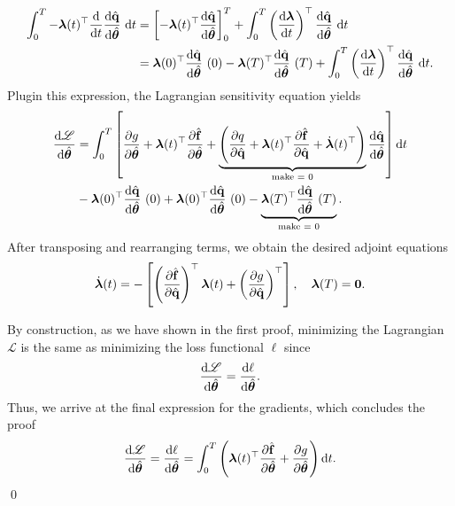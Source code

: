 \begin{align*}
    \int_0^T -\bm{\lambda}(t)^{\top}\dv{t}\dv{\hat{\mathbf{q}}}{\hat{\bm{\theta}}}~\dd t &= \left[ -\bm{\lambda}(t)^{\top}\dv{\hat{\mathbf{q}}}{\hat{\bm{\theta}}}\right]_0^T + \int_0^T \left( \dv{\bm{\lambda}}{t}\right)^{\top}\dv{\hat{\mathbf{q}}}{\hat{\bm{\theta}}}~\dd t\\
    &= \bm{\lambda}(0)^{\top}\dv{\hat{\mathbf{q}}}{\hat{\bm{\theta}}}~(0) - \bm{\lambda}(T)^{\top}\dv{\hat{\mathbf{q}}}{\hat{\bm{\theta}}}~(T) + \int_0^T \left( \dv{\bm{\lambda}}{t}\right)^{\top}\dv{\hat{\mathbf{q}}}{\hat{\bm{\theta}}}~\dd t.
\end{align*}
Plugin this expression, the Lagrangian sensitivity equation  yields\\
\begin{align*}
   \dv{\mathscr{L}}{\hat{\bm{\theta}}} &= \int_0^T\left[ \pdv{g}{\hat{\bm{\theta}}} + \bm{\lambda}(t)^{\top} \pdv{\hat{\mathbf{f}}}{\hat{\bm{\theta}}} + \underbrace{\left( \pdv{q}{\hat{\mathbf{q}}} + \bm{\lambda}(t)^{\top}\pdv{\hat{\mathbf{f}}}{\hat{\mathbf{q}}}+ \dot{\bm{\lambda}}(t)^{\top}\right)}_{\text{make = 0}} \dv{\hat{\mathbf{q}}}{\hat{\bm{\theta}}} \right]\dd t \\
   & - \bm{\lambda}(0)^{\top}\dv{\hat{\mathbf{q}}}{\hat{\bm{\theta}}}~(0)+\bm{\lambda}(0)^{\top}\dv{\hat{\mathbf{q}}}{\hat{\bm{\theta}}}~(0) - \underbrace{\bm{\lambda}(T)^{\top}\dv{\hat{\mathbf{q}}}{\hat{\bm{\theta}}}~(T)}_{\text{make = 0}}.
\end{align*}
 After transposing and rearranging terms, we obtain the desired adjoint equations\\
\begin{equation*}
    \dot{\bm{\lambda}}(t) = -\left[ \left(\pdv{\hat{\mathbf{f}}}{\hat{\mathbf{q}}}\right)^{\top} \bm{\lambda}(t)  + \left(\pdv{g}{\hat{\mathbf{q}}}\right)^{\top}\right], \quad\bm{\lambda}(T) = \bm{0}.
\end{equation*}

By construction, as we have shown in the first proof,  minimizing the Lagrangian $\mathscr{L}$ is the same as minimizing the loss functional $\ell$ since\\
$$\dv{\mathscr{L}}{\hat{\bm{\theta}}} = \dv{\ell}{\hat{\bm{\theta}}}.$$
Thus, we arrive at the final expression for the gradients, which concludes the proof\\
\begin{equation*}
    \dv{\mathscr{L}}{\hat{\bm{\theta}}} =\dv{\ell}{\hat{\bm{\theta}}} = \int_0^T\left(  \bm{\lambda}(t)^{\top} \pdv{\hat{\mathbf{f}}}{\hat{\bm{\theta}}} + \pdv{g}{\hat{\bm{\theta}}} \right)\dd t .
\end{equation*}
\qed

